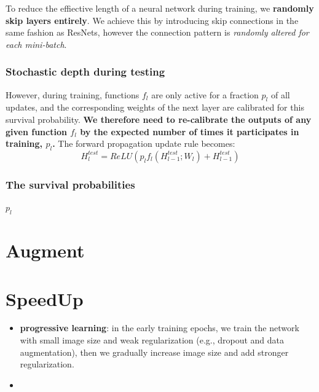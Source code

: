 To reduce the effiective length of a neural network during training, 
we \textbf{randomly skip layers entirely}. 
We achieve this by introducing skip connections in the same fashion as ResNets, 
however the connection pattern is \textit{randomly altered for each mini-batch}.

\subsubsection{Stochastic depth during testing} 
However, during training, functions $f_l$ are only active for a fraction $p_l$ of all updates, 
and the corresponding weights of the next layer are calibrated for this survival probability. 
\textbf{We therefore need to re-calibrate the outputs of any given function $f_l$ by the expected number of times
it participates in training, $p_l$.} The forward propagation update rule becomes:
\[
    H_l^{test} = ReLU(p_l f_l(H^{test}_{l-1}; W_l) + H^{test}_{l-1})
\]

\subsubsection{The survival probabilities}
$p_l$

\section{Augment}
\section{SpeedUp}
\begin{itemize}
    \item \textbf{progressive learning}: in the early training epochs, we train the
    network with small image size and weak regularization (e.g., dropout and data augmentation),
    then we gradually increase image size and add stronger regularization.
    \item 
\end{itemize}